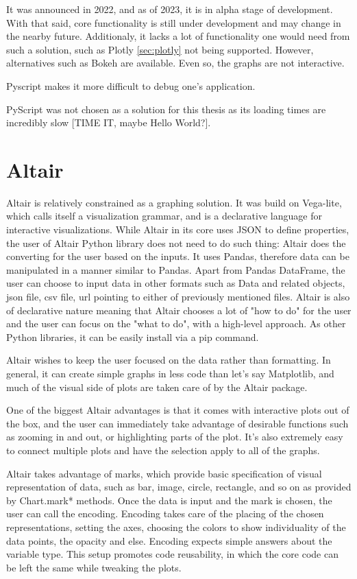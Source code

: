 It was announced in 2022, and as of 2023, it is in alpha stage of development. With that said, core functionality is still under development and may change in the nearby future. Additionaly, it lacks a lot of functionality one would need from such a solution, such as Plotly \ref{sec:plotly} not being supported. However, alternatives such as Bokeh are available. Even so, the graphs are not interactive. 

Pyscript makes it more difficult to debug one's application. 

PyScript was not chosen as a solution for this thesis as its loading times are incredibly slow [TIME IT, maybe Hello World?].

\section{Altair}
\label{sec:networkx}
Altair is relatively constrained as a graphing solution. It was build on Vega-lite, which calls itself a visualization grammar, and is a declarative language for interactive visualizations. While Altair in its core uses JSON to define properties, the user of Altair Python library does not need to do such thing: Altair does the converting for the user based on the inputs. It uses Pandas, therefore data can be manipulated in a manner similar to Pandas. Apart from Pandas DataFrame, the user can choose to input data in other formats such as Data and related objects, json file, csv file, url pointing to either of previously mentioned files. Altair is also of declarative nature meaning that Altair chooses a lot of "how to do" for the user and the user can focus on the "what to do", with a high-level approach. As other Python libraries, it can be easily install via a pip command. 

Altair wishes to keep the user focused on the data rather than formatting. In general, it can create simple graphs in less code than let's say Matplotlib, and much of the visual side of plots are taken care of by the Altair package. 

One of the biggest Altair advantages is that it comes with interactive plots out of the box, and the user can immediately take advantage of desirable functions such as zooming in and out, or highlighting parts of the plot. It's also extremely easy to connect multiple plots and have the selection apply to all of the graphs. 

Altair takes advantage of marks, which provide basic specification of visual representation of data, such as bar, image, circle, rectangle, and so on as provided by Chart.mark* methods. Once the data is input and the mark is chosen, the user can call the encoding. Encoding takes care of the placing of the chosen representations, setting the axes, choosing the colors to show individuality of the data points, the opacity and else. Encoding expects simple answers about the variable type. This setup promotes code reusability, in which the core code can be left the same while tweaking the plots.

